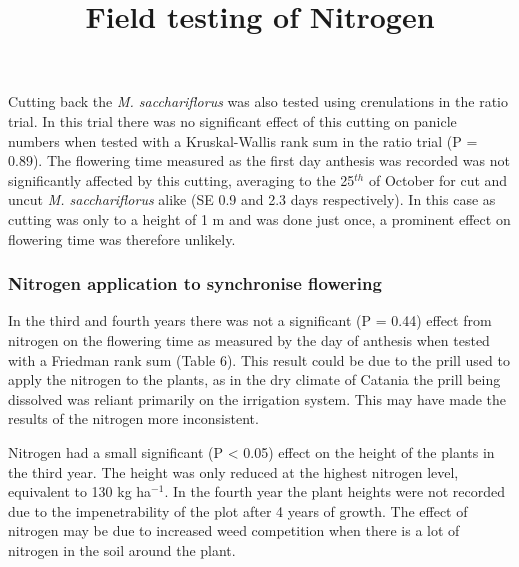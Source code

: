 \documentclass[fleqn, 15pt, lineno]{olplainarticle}
\begin{document}
Cutting back the \textit{M. sacchariflorus} was also tested using crenulations in the ratio trial.
In this trial there was no significant effect of this cutting on panicle numbers when tested with a Kruskal-Wallis rank sum in the ratio trial (P = 0.89).
The flowering time measured as the first day anthesis was recorded was not significantly affected by this cutting, averaging to the 25$^{th}$ of October for cut and uncut \textit{M. sacchariflorus} alike (SE 0.9 and 2.3 days respectively).
In this case as cutting was only to a height of 1 m and was done just once, a prominent effect on flowering time was therefore unlikely.



\FloatBarrier
\subsubsection{Nitrogen application to synchronise flowering}
\title{Field testing of Nitrogen}

In the third and fourth years there was not a significant (P = 0.44) effect from nitrogen on the flowering time as measured by the day of anthesis when tested with a Friedman rank sum (Table 6).
This result could be due to the prill used to apply the nitrogen to the plants, as in the dry climate of Catania the prill being dissolved was reliant primarily on the irrigation system.
This may have made the results of the nitrogen more inconsistent.

Nitrogen had a small significant (P < 0.05) effect on the height of the plants in the third year.
The height was only reduced at the highest nitrogen level, equivalent to 130 kg ha$^{-1}$.
In the fourth year the plant heights were not recorded due to the impenetrability of the plot after 4 years of growth.
The effect of nitrogen may be due to increased weed competition when there is a lot of nitrogen in the soil around the plant.
\end{document}
